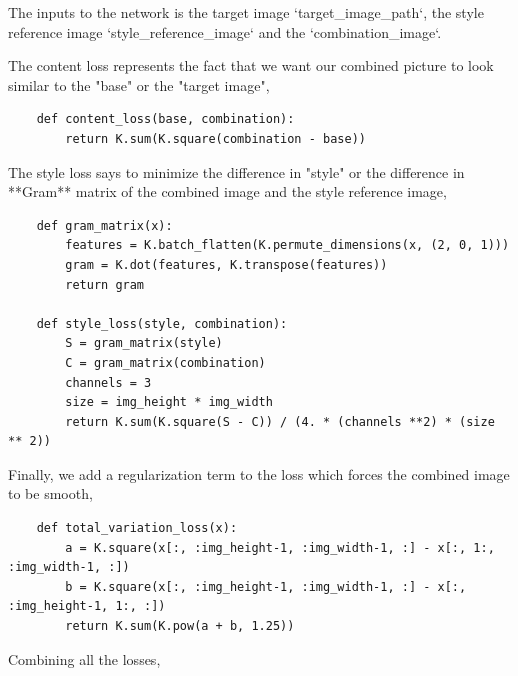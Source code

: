 \documentclass[graybox]{svmult}
\begin{document}
The inputs to the network is the target image `target_image_path`, the style reference image `style_reference_image` and the `combination_image`.

The content loss represents the fact that we want our combined picture to look similar to the "base" or the "target image",

\begin{verbatim}
    def content_loss(base, combination):
        return K.sum(K.square(combination - base))
\end{verbatim}

The style loss says to minimize the difference in "style" or the difference in **Gram** matrix of the combined image and the style reference image,

\begin{verbatim}
    def gram_matrix(x):
        features = K.batch_flatten(K.permute_dimensions(x, (2, 0, 1)))
        gram = K.dot(features, K.transpose(features))
        return gram

    def style_loss(style, combination):
        S = gram_matrix(style)
        C = gram_matrix(combination)
        channels = 3
        size = img_height * img_width
        return K.sum(K.square(S - C)) / (4. * (channels **2) * (size ** 2))
\end{verbatim}

Finally, we add a regularization term to the loss which forces the combined image to be smooth,

\begin{verbatim}
    def total_variation_loss(x):
        a = K.square(x[:, :img_height-1, :img_width-1, :] - x[:, 1:, :img_width-1, :])
        b = K.square(x[:, :img_height-1, :img_width-1, :] - x[:, :img_height-1, 1:, :])
        return K.sum(K.pow(a + b, 1.25))
\end{verbatim}

Combining all the losses,
\end{document}
